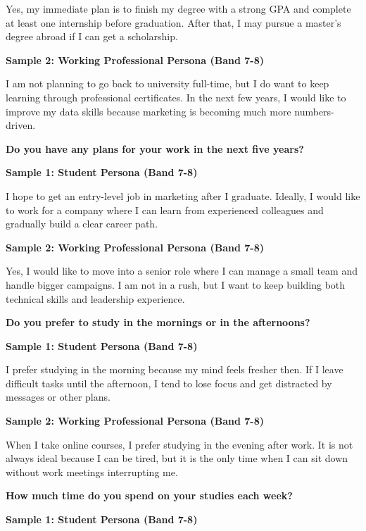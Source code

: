 Yes, my immediate plan is to finish my degree with a strong GPA and complete at least one internship before graduation. After that, I may pursue a master's degree abroad if I can get a scholarship.

\textbf{Sample 2: Working Professional Persona (Band 7-8)}

I am not planning to go back to university full-time, but I do want to keep learning through professional certificates. In the next few years, I would like to improve my data skills because marketing is becoming much more numbers-driven.

\separator

\begin{ieltsquestion}
\textbf{Do you have any plans for your work in the next five years?}
\end{ieltsquestion}
\textbf{Sample 1: Student Persona (Band 7-8)}

I hope to get an entry-level job in marketing after I graduate. Ideally, I would like to work for a company where I can learn from experienced colleagues and gradually build a clear career path.

\textbf{Sample 2: Working Professional Persona (Band 7-8)}

Yes, I would like to move into a senior role where I can manage a small team and handle bigger campaigns. I am not in a rush, but I want to keep building both technical skills and leadership experience.

\separator

\begin{ieltsquestion}
\textbf{Do you prefer to study in the mornings or in the afternoons?}
\end{ieltsquestion}
\textbf{Sample 1: Student Persona (Band 7-8)}

I prefer studying in the morning because my mind feels fresher then. If I leave difficult tasks until the afternoon, I tend to lose focus and get distracted by messages or other plans.

\textbf{Sample 2: Working Professional Persona (Band 7-8)}

When I take online courses, I prefer studying in the evening after work. It is not always ideal because I can be tired, but it is the only time when I can sit down without work meetings interrupting me.

\separator

\begin{ieltsquestion}
\textbf{How much time do you spend on your studies each week?}
\end{ieltsquestion}
\textbf{Sample 1: Student Persona (Band 7-8)}

